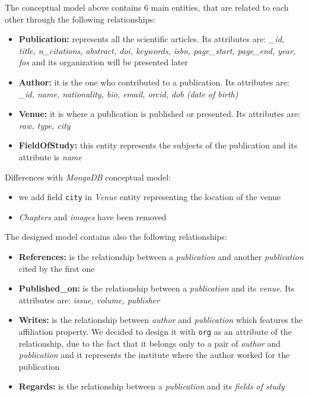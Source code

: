 \documentclass{Configuration_Files/PoliMi3i_thesis}
\begin{document}
The conceptual model above contains 6 main entities, that are related to each other through the following relationships:
\begin{itemize}
    \item \textbf{Publication:} represents all the scientific articles. Its attributes are: \emph{\_id, title, n\_citations,
        abstract, doi, keywords, isbn, page\_start, page\_end, year, fos} and its
        organization will be presented later
    \item \textbf{Author:} it is the one who contributed to a publication. Its attributes are: \emph{\_id, name, nationality,
        bio, email, orcid, dob (date of birth)}
    \item \textbf{Venue:} it is where a publication is published or presented. Its attributes are: \emph{raw, type,
        city}
    \item \textbf{FieldOfStudy:} this entity represents the subjects of the publication and its attribute is \emph{name}
\end{itemize}
\bigskip
Differences with \emph{MongoDB} conceptual model:
\begin{itemize}
    \item we add field \verb |city| in \emph{Venue} entity representing the location of the venue 
    \item \emph{Chapters} and \emph{images} have been removed
\end{itemize}
\bigskip

The designed model contains also the following relationships:
\begin{itemize}
    \item \textbf{References:} is the relationship between a \emph{publication} and another \emph{publication} cited by the first one
    \item \textbf{Published\_on:} is the relationship between a \emph{publication} and its \emph{venue}. Its attributes are: \emph{ issue, volume, publisher}
    \item \textbf{Writes:} is the relationship between \emph{author} and \emph{publication} which features the affiliation property.
        We decided to design it with \verb |org| as an attribute of the relationship, due to the fact that it belongs
        only to a pair of \emph{author} and \emph{publication} and it represents the institute where the author worked for the publication
    \item \textbf{Regards:} is the relationship between a \emph{publication} and its \emph{fields of study}
\end{itemize}
\end{document}

